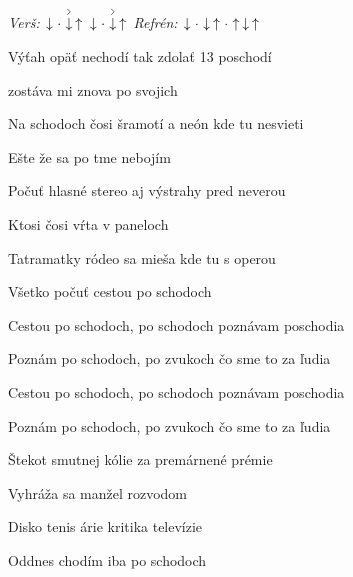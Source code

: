 \begin{song}


\begin{headerbox}
\RaiseBoxWithAccents
{} \quad
\textit{Verš:} $\Down\Miss\AccentDown\Up\ \Down\Miss\AccentDown\Up$ \quad
\textit{Refrén:} $\Down\Miss\Down\Up\Miss\Up\Down\Up$
\end{headerbox}

\begin{hchordbox}
\end{hchordbox}

\Large

\bigskip

Výťah opäť nechodí tak zdolať 13 poschodí \par
{}zostáva mi znova po svojich \par
Na schodoch čosi šramotí a neón kde tu nesvieti \par
{}Ešte že sa po tme nebojím \par

\bigskip

Počuť hlasné stereo aj výstrahy pred neverou \par
{}Ktosi čosi vŕta v paneloch \par
{}Tatramatky ródeo sa mieša kde tu s operou \par
{}Všetko počuť cestou po schodoch \par

\bigskip

Cestou po schodoch, po schodoch poznávam poschodia \par
Poznám po schodoch, po zvukoch čo sme to za ľudia \par
Cestou po schodoch, po schodoch poznávam poschodia \par
Poznám po schodoch, po zvukoch čo sme to za ľudia \par

\bigskip

Štekot smutnej kólie za premárnené prémie \par
{}Vyhráža sa manžel rozvodom \par
{}Disko tenis árie kritika televízie \par
{}Oddnes chodím iba po schodoch \par


\end{song}

